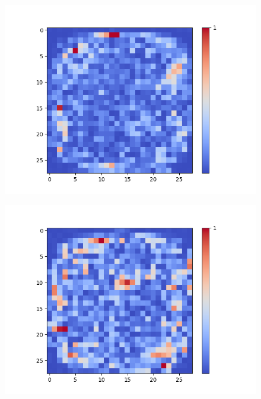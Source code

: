 \begin{figure}[H]
	\centering
	\begin{minipage}[b]{0.19\textwidth}
		\captionsetup{labelformat=empty}
		\includegraphics[width=\textwidth]{Sigmoid(Hidden-Layer)/Layer0-Neuron-6.png}
		\label{}
	\end{minipage}
	\begin{minipage}[b]{0.19\textwidth}
		\captionsetup{labelformat=empty}
		\includegraphics[width=\textwidth]{Sigmoid(Hidden-Layer)/Layer0-Neuron-7.png}
		\label{}
	\end{minipage}
	\begin{minipage}[b]{0.19\textwidth}
		\captionsetup{labelformat=empty}

\end{minipage}
\end{figure}
